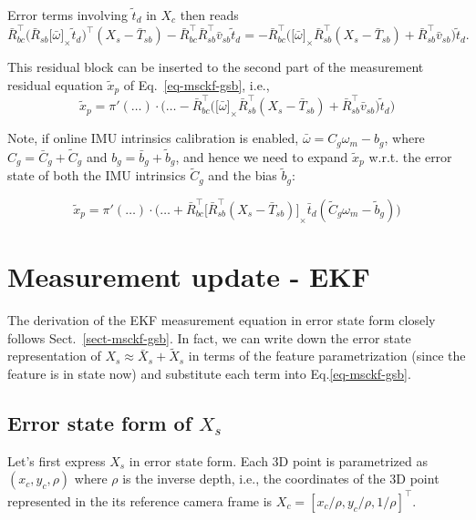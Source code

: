 \documentclass[letter,10pt]{article}
\newcommand{\asym}[1]{{\lbrack #1\rbrack}_\times{}}
\begin{document}
Error terms involving $\tilde t_d$ in $X_c$ then reads
$$
\bar R_{bc}^\top \big(\bar R_{sb}\asym{\bar\omega}\tilde t_d)^\top (X_s-\bar T_{sb}) - \bar R_{bc}^\top \bar R_{sb}^\top \bar v_{sb} \tilde t_d
= -\bar R_{bc}^\top \big(\asym{\bar\omega}\bar R_{sb}^\top (X_s - \bar T_{sb}) + \bar R_{sb}^\top \bar v_{sb} \big)\tilde t_d.
$$

This residual block can be inserted to the second part of the measurement residual equation $\tilde x_p$ of Eq.~\eqref{eq-msckf-gsb}, i.e., 
$$
\tilde x_p=\pi'(\ldots)\cdot\big(\ldots
- \bar R_{bc}^\top \big(\asym{\bar\omega}\bar R_{sb}^\top (X_s- \bar T_{sb}) + \bar R_{sb}^\top \bar v_{sb} \big)\tilde t_d
\big)
$$

Note, if online IMU intrinsics calibration is enabled, $\bar \omega=C_g \omega_m - b_g$, where $C_g = \bar C_g + \tilde C_g$ and $b_g=\bar b_g + \tilde b_g$, and hence we need to expand $\tilde x_p$ w.r.t. the error state of both the IMU intrinsics $\tilde C_g$ and the bias $\tilde b_g$:

$$
\tilde x_p
= \pi'(\ldots)\cdot
\big(
    \ldots
    +\bar R_{bc}^\top\asym{\bar R_{sb}^\top (X_s - \bar T_{sb})} \bar t_d 
    ( \tilde C_g \omega_m - \tilde b_g)
\big)
$$







\section{Measurement update - EKF}

The derivation of the EKF measurement equation in error state form closely follows Sect.~\ref{sect-msckf-gsb}. In fact, we can write down the error state representation of $X_s\approx \bar{X}_s + \tilde{X}_s$ in terms of the feature parametrization (since the feature is in state now) and substitute each term into Eq.\eqref{eq-msckf-gsb}.

\subsection{Error state form of $X_s$}

Let's first express $X_s$ in error state form. Each 3D point is parametrized as $(x_c, y_c, \rho)$ where $\rho$ is the inverse depth, i.e., the coordinates of the 3D point represented in the its reference camera frame is $X_c = [x_c/\rho, y_c/\rho, 1/\rho]^\top$.
\end{document}
